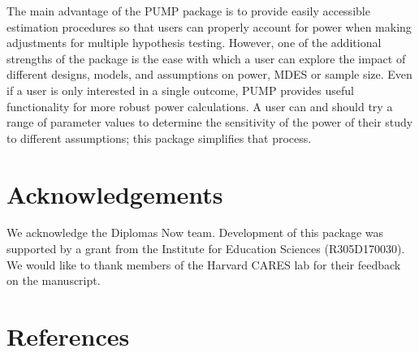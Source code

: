 \documentclass[
]{article}
\begin{document}
The main advantage of the PUMP package is to provide easily accessible
estimation procedures so that users can properly account for power when
making adjustments for multiple hypothesis testing. However, one of the
additional strengths of the package is the ease with which a user can
explore the impact of different designs, models, and assumptions on
power, MDES or sample size. Even if a user is only interested in a
single outcome, PUMP provides useful functionality for more robust power
calculations. A user can and should try a range of parameter values to
determine the sensitivity of the power of their study to different
assumptions; this package simplifies that process.

\section*{Acknowledgements}

We acknowledge the Diplomas Now team. Development of this package was
supported by a grant from the Institute for Education Sciences
(R305D170030). We would like to thank members of the Harvard CARES lab
for their feedback on the manuscript.

\section{References}
\end{document}
